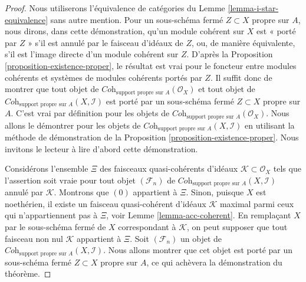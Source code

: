 \begin{proof}
Nous utiliserons l'équivalence de catégories du
Lemme \ref{lemma-i-star-equivalence}
sans autre mention.
Pour un sous-schéma fermé $Z \subset X$ propre sur $A$,
nous dirons, dans cette démonstration, qu'un module cohérent sur $X$ est
« porté par $Z$ » s'il est annulé par le faisceau
d'idéaux de $Z$, ou, de manière équivalente, s'il est l'image directe
d'un module cohérent sur $Z$.
D'après la Proposition \ref{proposition-existence-proper},
le résultat est vrai pour
le foncteur entre modules cohérents et systèmes de modules
cohérents portés par $Z$. Il suffit donc de montrer que
tout objet de
$\textit{Coh}_{\text{support propre sur }A}(\mathcal{O}_X)$
et tout objet de
$\textit{Coh}_{\text{support propre sur }A}(X, \mathcal{I})$ est
porté par un sous-schéma fermé $Z \subset X$ propre sur $A$.
C'est vrai par définition pour les objets de
$\textit{Coh}_{\text{support propre sur }A}(\mathcal{O}_X)$.
Nous allons le démontrer pour les objets de
$\textit{Coh}_{\text{support propre sur }A}(X, \mathcal{I})$
en utilisant la méthode de démonstration de la Proposition \ref{proposition-existence-proper}.
Nous invitons le lecteur à lire d'abord cette démonstration.

\medskip\noindent
Considérons l'ensemble $\Xi$ des faisceaux quasi-cohérents d'idéaux
$\mathcal{K} \subset \mathcal{O}_X$ tels que l'assertion soit vraie
pour tout objet $(\mathcal{F}_n)$ de
$\textit{Coh}_{\text{support propre sur }A}(X, \mathcal{I})$
annulé par $\mathcal{K}$. Montrons que $(0)$ appartient à $\Xi$.
Sinon, puisque $X$ est noethérien, il existe un faisceau quasi-cohérent
d'idéaux $\mathcal{K}$ maximal parmi ceux qui n'appartiennent pas à $\Xi$, voir
Lemme \ref{lemma-acc-coherent}.
En remplaçant $X$ par le sous-schéma fermé de $X$
correspondant à $\mathcal{K}$, on peut supposer que tout faisceau non nul
$\mathcal{K}$ appartient à $\Xi$. Soit $(\mathcal{F}_n)$ un objet de
$\textit{Coh}_{\text{support propre sur }A}(X, \mathcal{I})$.
Nous allons montrer que cet objet est porté par un sous-schéma fermé
$Z \subset X$ propre sur $A$, ce qui achèvera la
démonstration du théorème.


\end{proof}
